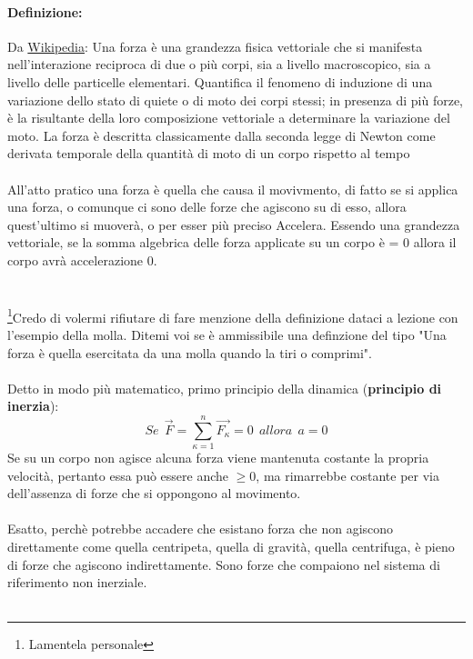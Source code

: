 \documentclass[12pt, a4paper, openany, oneside]{book}
\begin{document}
\paragraph{Definizione: }Da \href{https://it.wikipedia.org/wiki/Forza}{Wikipedia}: 
Una forza è una grandezza fisica 
vettoriale che si manifesta nell'interazione reciproca di due o più corpi, sia 
a livello macroscopico, sia a livello delle particelle elementari. Quantifica il 
fenomeno di induzione di una variazione dello stato di quiete o di moto dei corpi 
stessi; in presenza di più forze, è la risultante della loro composizione vettoriale
a determinare la variazione del moto. La forza è descritta classicamente dalla 
seconda legge di Newton come derivata temporale della quantità di moto di un
corpo rispetto al tempo \\ \\
All'atto pratico una forza è quella che causa il movivmento, di fatto se si 
applica una forza, o comunque ci sono delle forze che agiscono su di esso, allora
quest'ultimo si muoverà, o per esser più preciso Accelera. Essendo una grandezza
vettoriale, se la somma algebrica delle forza applicate su un corpo è = 0 allora
il corpo avrà accelerazione 0. \\ \\ \\
\footnote{Lamentela personale}Credo di volermi rifiutare di fare menzione della 
definizione dataci a lezione con l'esempio della molla. Ditemi voi se è ammissibile 
una definzione del tipo "Una forza è quella esercitata da una molla quando la tiri 
o comprimi". 
\\ \\
Detto in modo più matematico, primo principio della dinamica (\textbf{principio di inerzia}):
\[
Se~~\overrightarrow{F} = \sum_{\kappa=1}^n \overrightarrow{F_{\kappa}} = 0
~~ allora ~~ a = 0
\]
Se su un corpo non agisce alcuna forza viene mantenuta costante la propria 
velocità, pertanto essa può essere anche $\geq 0$, ma rimarrebbe costante per
via dell'assenza di forze che si oppongono al movimento.
\\ \\
Esatto, perchè potrebbe accadere che esistano forza che non agiscono direttamente
come quella centripeta, quella di gravità, quella centrifuga, è pieno di forze
che agiscono indirettamente. Sono forze che compaiono nel sistema di riferimento
non inerziale.
\\ \\
\end{document}
